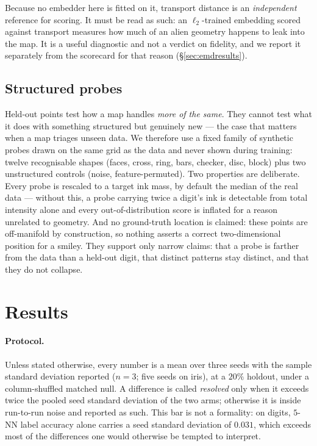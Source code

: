 \documentclass[12pt]{iopart}
\theoremstyle{definition}
\theoremstyle{plain}
\theoremstyle{remark}
\begin{document}
Because no embedder here is fitted on it, transport distance is an
\emph{independent} reference for scoring. It must be read as such: an
$\ell_2$-trained embedding scored against transport measures how much of an
alien geometry happens to leak into the map. It is a useful diagnostic and not
a verdict on fidelity, and we report it separately from the scorecard for that
reason (\S\ref{sec:emdresults}).

\subsection{Structured probes}
\label{sec:probes}

Held-out points test how a map handles \emph{more of the same}. They cannot
test what it does with something structured but genuinely new --- the case that
matters when a map triages unseen data. We therefore use a fixed family of
synthetic probes drawn on the same grid as the data and never shown during
training: twelve recognisable shapes (faces, cross, ring, bars, checker, disc,
block) plus two unstructured controls (noise, feature-permuted). Two properties
are deliberate. Every probe is rescaled to a target ink mass, by default the
median of the real data --- without this, a probe carrying twice a digit's ink
is detectable from total intensity alone and every out-of-distribution score is
inflated for a reason unrelated to geometry. And no ground-truth location is
claimed: these points are off-manifold by construction, so nothing asserts a
correct two-dimensional position for a smiley. They support only narrow claims:
that a probe is farther from the data than a held-out digit, that distinct
patterns stay distinct, and that they do not collapse.

\section{Results}
\label{sec:results}

\paragraph{Protocol.}
Unless stated otherwise, every number is a mean over three seeds with the
sample standard deviation reported ($n=3$; five seeds on iris), at a $20\%$
holdout, under a column-shuffled matched null. A difference is called
\emph{resolved} only when it exceeds twice the pooled seed standard deviation
of the two arms; otherwise it is inside run-to-run noise and reported as such.
This bar is not a formality: on digits, $5$-NN label accuracy alone carries a
seed standard deviation of $0.031$, which exceeds most of the differences one
would otherwise be tempted to interpret.
\end{document}
